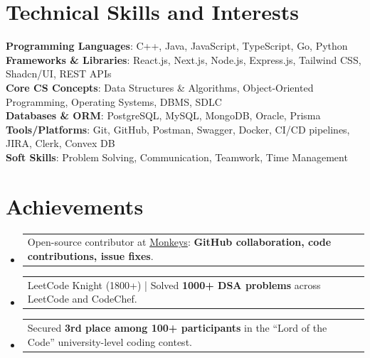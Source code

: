 \documentclass[a4paper,11pt]{article}
\makeatletter
\newcommand{\resumePOR}[3]{
\vspace{0.5mm}\item
    \begin{tabular*}{0.97\textwidth}[t]{l@{\extracolsep{\fill}}r}
        \textbf{#1}\hspace{0.3mm}#2 & \textit{\small{#3}} 
    \end{tabular*}
    \vspace{-2mm}
}
\newcommand{\resumeSubHeadingListStart}{\begin{itemize}[leftmargin=*,labelsep=0mm]}
\newcommand{\resumeSubHeadingListEnd}{\end{itemize}\vspace{2mm}}
\makeatother
\begin{document}
\section{\textbf{Technical Skills and Interests}}
 \begin{itemize}[leftmargin=0.1in, label={}]
    \small{{
\item \textbf{Programming Languages}: C++, Java, JavaScript, TypeScript, Go, Python \\
\textbf{Frameworks \& Libraries}: React.js, Next.js, Node.js, Express.js, Tailwind CSS, Shadcn/UI, REST APIs \\
\textbf{Core CS Concepts}: Data Structures \& Algorithms, Object-Oriented Programming, Operating Systems, DBMS, SDLC \\
\textbf{Databases \& ORM}: PostgreSQL, MySQL, MongoDB, Oracle, Prisma \\
\textbf{Tools/Platforms}: Git, GitHub, Postman, Swagger, Docker, CI/CD pipelines, JIRA, Clerk, Convex DB \\
\textbf{Soft Skills}: Problem Solving, Communication, Teamwork, Time Management
        
    }}
 \end{itemize}
 \vspace{-16pt}








\section{\textbf{Achievements}}
\vspace{-0.2mm}
\resumeSubHeadingListStart
\resumePOR{} %
    {Open-source contributor at \href{https://monkeys.com.co/}{Monkeys}: \textbf{GitHub collaboration, code contributions, issue fixes}.} %
    {} %

\resumePOR{} %
    {LeetCode Knight (1800+) | Solved \textbf{1000+ DSA problems} across LeetCode and CodeChef.} %
    {} %
    
\resumePOR{} %
    {Secured \textbf{3rd place among 100+ participants} in the ``Lord of the Code'' university-level coding contest.} %
    {} %
\resumeSubHeadingListEnd
\vspace{-5mm}



\end{document}
